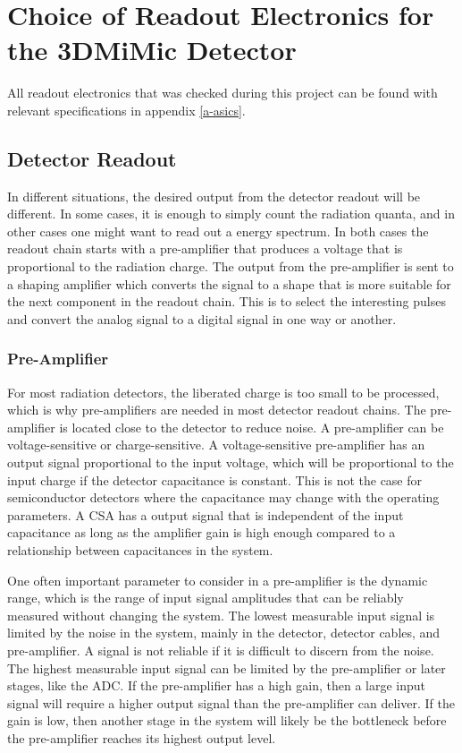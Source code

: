 \documentclass[../main/thesis.tex]{subfiles}
\begin{document}
\newpage

\chapter{Choice of Readout Electronics for the 3DMiMic Detector}
\label{e}

All readout electronics that was checked during this project can be found with relevant specifications in appendix \ref{a-asics}. 

\section{Detector Readout}
\label{t-read}
In different situations, the desired output from the detector readout will be different. In some cases, it is enough to simply count the radiation quanta, and in other cases one might want to read out a energy spectrum. In both cases the readout chain starts with a pre-amplifier that produces a voltage that is proportional to the radiation charge. The output from the pre-amplifier is sent to a shaping amplifier which converts the signal to a shape that is more suitable for the next component in the readout chain. This is to select the interesting pulses and convert the analog signal to a digital signal in one way or another. \citep[chap. 16]{Knoll}

\subsection{Pre-Amplifier}
\label{t-amp}
For most radiation detectors, the liberated charge is too small to be processed, which is why pre-amplifiers are needed in most detector readout chains. The pre-amplifier is located close to the detector to reduce noise. A pre-amplifier can be voltage-sensitive or charge-sensitive. A voltage-sensitive pre-amplifier has an output signal proportional to the input voltage, which will be proportional to the input charge if the detector capacitance is constant. This is not the case for semiconductor detectors where the capacitance may change with the operating parameters. A \gls{CSA} has a output signal that is independent of the input capacitance as long as the amplifier gain is high enough compared to a relationship between capacitances in the system. \citep[chap. 16]{Knoll}

One often important parameter to consider in a pre-amplifier is the dynamic range, which is the range of input signal amplitudes that can be reliably measured without changing the system. The lowest measurable input signal is limited by the noise in the system, mainly in the detector, detector cables, and pre-amplifier. A signal is not reliable if it is difficult to discern from the noise. The highest measurable input signal can be limited by the pre-amplifier or later stages, like the \gls{ADC}. If the pre-amplifier has a high gain, then a large input signal will require a higher output signal than the pre-amplifier can deliver. If the gain is low, then another stage in the system will likely be the bottleneck before the pre-amplifier reaches its highest output level. \citep{dynamic-range}
\end{document}
